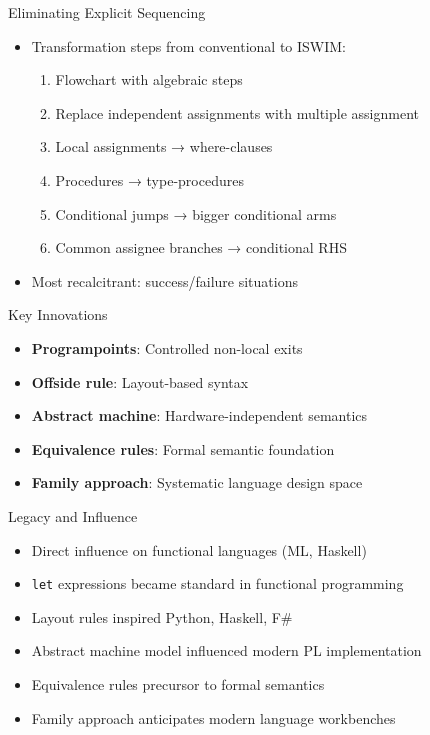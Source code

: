 \documentclass[10pt]{beamer}
\begin{document}
\begin{frame}{Eliminating Explicit Sequencing}
\begin{itemize}
\item Transformation steps from conventional to ISWIM:
  \begin{enumerate}
  \item Flowchart with algebraic steps
  \item Replace independent assignments with multiple assignment
  \item Local assignments → where-clauses
  \item Procedures → type-procedures
  \item Conditional jumps → bigger conditional arms
  \item Common assignee branches → conditional RHS
  \end{enumerate}
\item Most recalcitrant: success/failure situations
\end{itemize}
\end{frame}

\begin{frame}{Key Innovations}
\begin{itemize}
\item \textbf{Programpoints}: Controlled non-local exits
\item \textbf{Offside rule}: Layout-based syntax
\item \textbf{Abstract machine}: Hardware-independent semantics
\item \textbf{Equivalence rules}: Formal semantic foundation
\item \textbf{Family approach}: Systematic language design space
\end{itemize}
\end{frame}

\begin{frame}{Legacy and Influence}
\begin{itemize}
\item Direct influence on functional languages (ML, Haskell)
\item \texttt{let} expressions became standard in functional programming
\item Layout rules inspired Python, Haskell, F#
\item Abstract machine model influenced modern PL implementation
\item Equivalence rules precursor to formal semantics
\item Family approach anticipates modern language workbenches
\end{itemize}
\end{frame}
\end{document}
